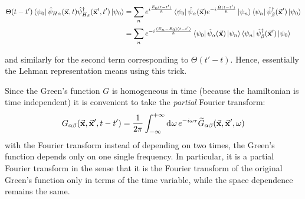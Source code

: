 \documentclass[../main/main.tex]{subfiles}
\begin{document}
\begin{small}
\begin{equation*}
\begin{split}
    \Theta (t-t') \bra{\psi _0}  \hat{\psi }_{H \alpha } (\va{x},t) \hat{\psi }_{H_ \beta }^\dag (\va{x}',t')  \ket{\psi _0} &=
    \sum_{n}^{}  e^{i \frac{E_0 (t-t')}{\hbar} }
    \bra{\psi _0 }  \hat{\psi }_ \alpha  (\va{x})
    e^{-i \frac{\hat{H} (t-t') }{\hbar }}  \ket{\psi _n} \bra{\psi _n} \hat{\psi }_ \beta ^\dag (\va{x}')\ket{\psi _0}  \\
    &= \sum_{n}^{}  e^{-i \frac{ (E_n-E_0) (t-t')}{\hbar} }
    \bra{\psi _0 }  \hat{\psi }_ \alpha  (\va{x})
  \ket{\psi _n} \bra{\psi _n} \hat{\psi }_ \beta ^\dag (\va{x}')\ket{\psi _0}
\end{split}
\end{equation*}
\end{small}
and similarly for the second term corresponding to \( \Theta (t'-t) \).
Hence, essentially the Lehman representation means using this trick.


Since the Green's function \( G \) is homogeneous in time (because the hamiltonian is time independent) it is convenient to take the \emph{partial} Fourier transform:
\begin{equation*}
  G_{\alpha \beta } (\va{x},\va{x}',t-t') = \frac{1}{2 \pi } \int_{- \infty }^{+ \infty } \dd[]{\omega } e^{- i \omega \tau } \widetilde{G}_{\alpha \beta } (\va{x},\va{x}', \omega )
\end{equation*}
with the Fourier transform instead of depending on two times, the Green's function depends only on one single frequency. In particular, it is a partial Fourier transform in the sense that it is the Fourier transform of the original Green's function only in terms of the time variable, while the space dependence remains the same.
\end{document}
